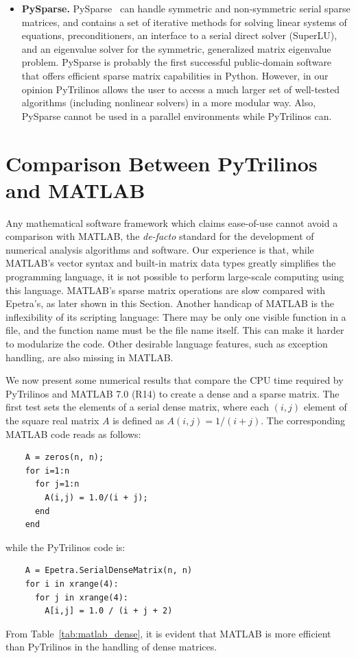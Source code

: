 \documentclass[acmtocl]{acmtrans2m}
\begin{document}
\begin{itemize}
  {\bf Why aren't we using ScientificPython?}

\item {\bf PySparse.}  PySparse~\cite{broker05using} can handle
  symmetric and non-symmetric serial sparse matrices, and contains a
  set of iterative methods for solving linear systems of equations,
  preconditioners, an interface to a serial direct solver (SuperLU),
  and an eigenvalue solver for the symmetric, generalized matrix
  eigenvalue problem.  PySparse is probably the first successful
  public-domain software that offers efficient sparse matrix
  capabilities in Python. However, in our opinion PyTrilinos allows
  the user to access a much larger set of well-tested algorithms
  (including nonlinear solvers) in a more modular way.  Also,
  PySparse cannot be used in a parallel environments while PyTrilinos
  can.

\end{itemize}

\section{Comparison Between PyTrilinos and MATLAB}
\label{sec:comparison_matlab}

Any mathematical software framework which claims ease-of-use cannot
avoid a comparison with MATLAB, the {\sl de-facto} standard for the
development of numerical analysis algorithms and software.
Our
experience is that, while MATLAB's vector syntax and built-in matrix
data types greatly simplifies the programming language, it is not
possible to perform large-scale computing using this language.
MATLAB's sparse matrix operations are slow compared with Epetra's, as later
shown in this Section.
Another handicap of MATLAB is the inflexibility of its scripting
language: There may be only one visible function in a file, and the
function name must be the file name itself. This can make it harder to
modularize the code. Other desirable language features, such as
exception handling, are also missing in MATLAB.

We now present some numerical results that compare the CPU time required by
PyTrilinos and MATLAB 7.0 (R14) to create a dense and a sparse matrix.
The first test sets the elements of a serial dense matrix, where each
$(i,j)$ element of the square real matrix $A$ is defined as $A(i,j) =
1/(i + j)$. The corresponding MATLAB code reads as follows:
\begin{verbatim}
    A = zeros(n, n);
    for i=1:n
      for j=1:n
        A(i,j) = 1.0/(i + j);
      end
    end
\end{verbatim}
while the PyTrilinos code is:
\begin{verbatim}
    A = Epetra.SerialDenseMatrix(n, n)
    for i in xrange(4):
      for j in xrange(4):
        A[i,j] = 1.0 / (i + j + 2)
\end{verbatim}
From Table~\ref{tab:matlab_dense}, it is evident that MATLAB is more
efficient than PyTrilinos in the handling of dense matrices.
\end{document}
